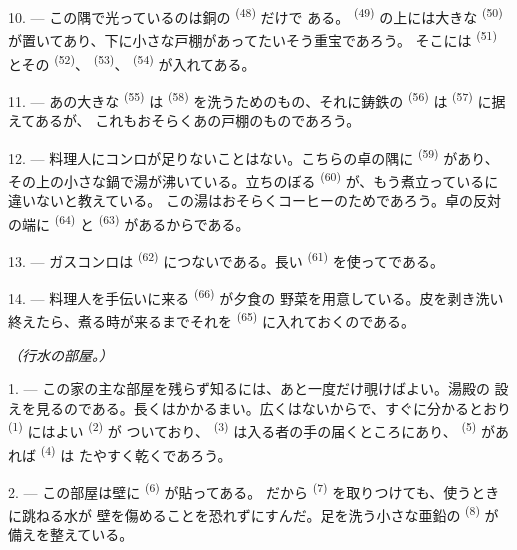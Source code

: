 10. --- この隅で光っているのは銅の \textsuperscript{(48)} だけで
ある。 \textsuperscript{(49)} の上には大きな
\textsuperscript{(50)} が置いてあり、下に小さな戸棚があってたいそう重宝であろう。
そこには \textsuperscript{(51)} とその
\textsuperscript{(52)}、 \textsuperscript{(53)}、
\textsuperscript{(54)} が入れてある。

\VUsaut{4.0mm}
\VUsaut{3.0mm}

11. --- あの大きな \textsuperscript{(55)} は
\textsuperscript{(58)} を洗うためのもの、それに鋳鉄の
\textsuperscript{(56)} は \textsuperscript{(57)} に据えてあるが、
これもおそらくあの戸棚のものであろう。

12. --- 料理人にコンロが足りないことはない。こちらの卓の隅に
\textsuperscript{(59)} があり、その上の小さな鍋で湯が沸いている。立ちのぼる
 \textsuperscript{(60)} が、もう煮立っているに違いないと教えている。
この湯はおそらくコーヒーのためであろう。卓の反対の端に
\textsuperscript{(64)} と \textsuperscript{(63)} があるからである。

13. --- ガスコンロは \textsuperscript{(62)} につないである。長い
 \textsuperscript{(61)} を使ってである。

14. --- 料理人を手伝いに来る \textsuperscript{(66)} が夕食の
野菜を用意している。皮を剥き洗い終えたら、煮る時が来るまでそれを
\textsuperscript{(65)} に入れておくのである。

\VUsaut{4.0mm}
{\centering\fontsize{10.2pt}{10.2pt}\selectfont{} \textit{（行水の部屋。）}\par}
\VUsaut{3.0mm}

1. --- この家の主な部屋を残らず知るには、あと一度だけ覗けばよい。湯殿の
設えを見るのである。長くはかかるまい。広くはないからで、すぐに分かるとおり
 \textsuperscript{(1)} にはよい \textsuperscript{(2)} が
ついており、 \textsuperscript{(3)} は入る者の手の届くところにあり、
 \textsuperscript{(5)} があれば \textsuperscript{(4)} は
たやすく乾くであろう。

2. --- この部屋は壁に \textsuperscript{(6)} が貼ってある。
だから \textsuperscript{(7)} を取りつけても、使うときに跳ねる水が
壁を傷めることを恐れずにすんだ。足を洗う小さな亜鉛の
\textsuperscript{(8)} が備えを整えている。
\VUsaut{6.0mm}
\VUfilet{22mm}
